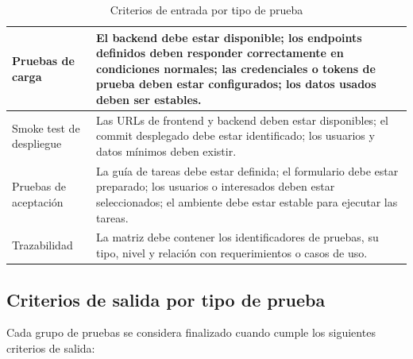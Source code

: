 \documentclass[12pt,letterpaper]{article}
\begin{document}
\begin{table}[H]
\begin{tabularx}{\textwidth}{|
>{\raggedright\arraybackslash}p{3.7cm}|
>{\raggedright\arraybackslash}X|}
Pruebas de carga &
El backend debe estar disponible; los endpoints definidos deben responder correctamente en condiciones normales; las credenciales o tokens de prueba deben estar configurados; los datos usados deben ser estables. \\
\hline

Smoke test de despliegue &
Las URLs de frontend y backend deben estar disponibles; el commit desplegado debe estar identificado; los usuarios y datos mínimos deben existir. \\
\hline

Pruebas de aceptación &
La guía de tareas debe estar definida; el formulario debe estar preparado; los usuarios o interesados deben estar seleccionados; el ambiente debe estar estable para ejecutar las tareas. \\
\hline

Trazabilidad &
La matriz debe contener los identificadores de pruebas, su tipo, nivel y relación con requerimientos o casos de uso. \\
\hline

\end{tabularx}

\endgroup
\caption{Criterios de entrada por tipo de prueba}
\label{tab:criterios-entrada-tipo-prueba}
\end{table}

\subsection{Criterios de salida por tipo de prueba}

Cada grupo de pruebas se considera finalizado cuando cumple los siguientes criterios de salida:
\end{document}
